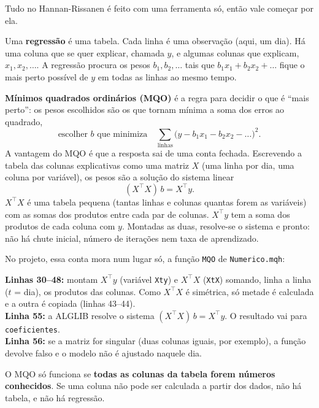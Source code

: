 \documentclass[11pt,a4paper]{article}
\newcommand{\inc}[1]{../../../robos/Include/#1}
\newcommand{\trecho}[4]{}
\begin{document}
Tudo no Hannan-Rissanen é feito com uma ferramenta só, então vale começar por ela.

Uma \textbf{regressão} é uma tabela. Cada linha é uma observação (aqui, um dia). Há uma coluna que se quer explicar,
chamada $y$, e algumas colunas que explicam, $x_1, x_2, \dots$. A regressão procura os pesos $b_1, b_2, \dots$ tais
que $b_1 x_1 + b_2 x_2 + \dots$ fique o mais perto possível de $y$ em todas as linhas ao mesmo tempo.

\textbf{Mínimos quadrados ordinários (MQO)} é a regra para decidir o que é ``mais perto'': os pesos escolhidos são os
que tornam mínima a soma dos erros ao quadrado,
\[
  \text{escolher } b \text{ que minimiza} \quad \sum_{\text{linhas}} \bigl(y - b_1x_1 - b_2x_2 - \dots\bigr)^2 .
\]
A vantagem do MQO é que a resposta sai de uma conta fechada. Escrevendo a tabela das colunas explicativas como uma
matriz $X$ (uma linha por dia, uma coluna por variável), os pesos são a solução do sistema linear
\[
  (X^\top X)\, b = X^\top y .
\]
$X^\top X$ é uma tabela pequena (tantas linhas e colunas quantas forem as variáveis) com as somas dos produtos entre
cada par de colunas. $X^\top y$ tem a soma dos produtos de cada coluna com $y$. Montadas as duas, resolve-se o sistema
e pronto: não há chute inicial, número de iterações nem taxa de aprendizado.

No projeto, essa conta mora num lugar só, a função \texttt{MQO} de \texttt{Numerico.mqh}:

\trecho{\inc{Numerico.mqh}}{30}{57}{robos/Include/Numerico.mqh}

\begin{leitura}
\textbf{Linhas 30--48:} montam $X^\top y$ (variável \texttt{Xty}) e $X^\top X$ (\texttt{XtX}) somando, linha a linha
($t$ = dia), os produtos das colunas. Como $X^\top X$ é simétrica, só metade é calculada e a outra é copiada
(linhas 43--44).\\
\textbf{Linha 55:} a ALGLIB resolve o sistema $(X^\top X)\,b = X^\top y$. O resultado vai para \texttt{coeficientes}.\\
\textbf{Linha 56:} se a matriz for singular (duas colunas iguais, por exemplo), a função devolve falso e o modelo não é
ajustado naquele dia.
\end{leitura}

\begin{cuidado}
O MQO só funciona se \textbf{todas as colunas da tabela forem números conhecidos}. Se uma coluna não pode ser
calculada a partir dos dados, não há tabela, e não há regressão.
\end{cuidado}
\end{document}
